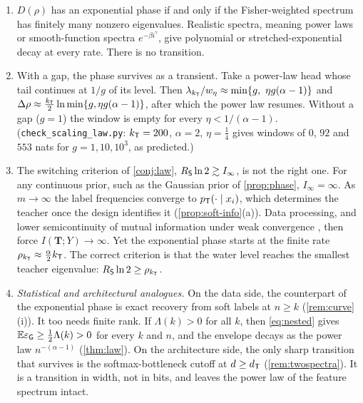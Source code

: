 \begin{corollary}\label{cor:expo}
\Pv
\begin{enumerate}[label=(\alph*),nosep,leftmargin=*]
\item $D(\rho)$ has an exponential phase if and only if the Fisher-weighted spectrum has finitely many
nonzero eigenvalues. Realistic spectra, meaning power laws or smooth-function spectra
$e^{-\beta i^\gamma}$, give polynomial or stretched-exponential decay at every rate. There is no transition.
\item With a gap, the phase survives as a transient. Take a power-law head whose tail continues at
$1/g$ of its level. Then $\lambda_{k_{\mathsf{T}}}/w_\eta\approx\min\{g,\ \eta g(\alpha-1)\}$ and $\Delta\rho\approx\frac{k_{\mathsf{T}}}2\ln\min\{g,\eta g(\alpha-1)\}$, after
which the power law resumes. Without a gap ($g=1$) the window is empty for every $\eta<1/(\alpha-1)$.
(\texttt{check\_scaling\_law.py}: $k_{\mathsf{T}}=200$, $\alpha=2$, $\eta=\frac14$ gives windows of $0$, $92$ and $553$ nats for
$g=1,10,10^3$, as predicted.)
\item The switching criterion of \cref{conj:law}, $R_{\mathsf{S}}\ln2\gtrsim I_\infty$, is not the right one. For any
continuous prior, such as the Gaussian prior of \cref{prop:phase}, $I_\infty=\infty$. As $m\to\infty$ the label frequencies
converge to $p_{\mathsf{T}}(\cdot\mid x_i)$, which determines the teacher once the design identifies it
(\cref{prop:soft-info}(a)). Data processing, and lower semicontinuity of mutual information under
weak convergence \citep{pinsker1964information}, then force $I(\mathbf T;Y)\to\infty$. Yet the exponential phase starts at
the finite rate $\rho_{k_{\mathsf{T}}}\approx\frac\alpha2k_{\mathsf{T}}$. The correct criterion is that the water level reaches the smallest
teacher eigenvalue: $R_{\mathsf{S}}\ln2\ge\rho_{k_{\mathsf{T}}}$.
\item \emph{Statistical and architectural analogues.} On the data side, the counterpart of the exponential
phase is exact recovery from soft labels at $n\ge k$ (\cref{rem:curve}(i)). It too needs finite rank. If
$\Lambda(k)>0$ for all $k$, then \eqref{eq:nested} gives $\mathbb{E}\varepsilon_{\mathsf G}\ge\frac12\Lambda(k)>0$ for every $k$ and $n$, and the envelope
decays as the power law $n^{-(\alpha-1)}$ (\cref{thm:law}). On the architecture side, the only sharp transition
that survives is the softmax-bottleneck cutoff at $d\ge d_{\mathsf{T}}$ (\cref{rem:twospectra}). It is a transition in
width, not in bits, and leaves the power law of the feature spectrum intact.
\end{enumerate}
\end{corollary}

